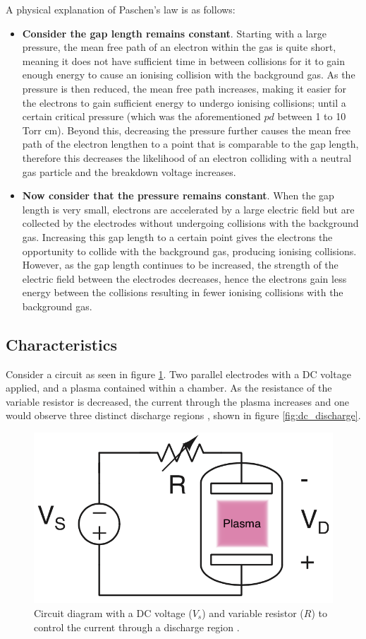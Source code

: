 \FloatBarrier

A physical explanation of Paschen's law is as follows:

\begin{itemize}
    \item \textbf{Consider the gap length remains constant}. Starting with a large pressure, the mean free path of an electron within the gas is quite short, meaning it does not have sufficient time in between collisions for it to gain enough energy to cause an ionising collision with the background gas. As the pressure is then reduced, the mean free path increases, making it easier for the electrons to gain sufficient energy to undergo ionising collisions; until a certain critical pressure (which was the aforementioned $pd$ between 1 to 10 Torr cm). Beyond this, decreasing the pressure further causes the mean free path of the electron lengthen to a point that is comparable to the gap length, therefore this decreases the likelihood of an electron colliding with a neutral gas particle and the breakdown voltage increases.
    \item \textbf{Now consider that the pressure remains constant}. When the gap length is very small, electrons are accelerated by a large electric field but are collected by the electrodes without undergoing collisions with the background gas. Increasing this gap length to a certain point gives the electrons the opportunity to collide with the background gas, producing ionising collisions. However, as the gap length continues to be increased, the strength of the electric field between the electrodes decreases, hence the electrons gain less energy between the collisions resulting in fewer ionising collisions with the background gas.
\end{itemize}

\subsection{Characteristics}

Consider a circuit as seen in figure \ref{fig:basic_circuit}. Two parallel electrodes with a DC voltage applied, and a plasma contained within a chamber. As the resistance of the variable resistor is decreased, the current through the plasma increases and one would observe three distinct discharge regions \cite{Gudmundsson2017}, shown in figure \ref{fig:dc_discharge}.

\begin{figure}[h!]
	\centering
	\includegraphics[width=0.45\linewidth]{chapter_2/figures/basic_circuit.png}
	\caption{Circuit diagram with a DC voltage ($V_s$) and variable resistor ($R$) to control the current through a discharge region \cite{Gudmundsson2017}.}
	\label{fig:basic_circuit}
\end{figure}

